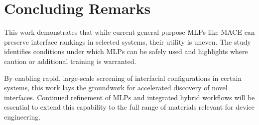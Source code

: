 \section{Concluding Remarks} \label{section:concluding_remarks}

This work demonstrates that while current general-purpose MLPs like MACE can preserve interface rankings in selected systems, their utility is uneven. The study identifies conditions under which MLPs can be safely used and highlights where caution or additional training is warranted.

By enabling rapid, large-scale screening of interfacial configurations in certain systems, this work lays the groundwork for accelerated discovery of novel interfaces. Continued refinement of MLPs and integrated hybrid workflows will be essential to extend this capability to the full range of materials relevant for device engineering.

